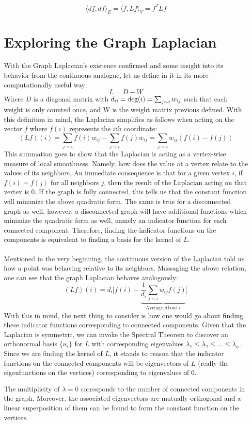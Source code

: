 \[
\langle df, df \rangle_E = \langle f, Lf \rangle_V = f^TLf
\]

\section{Exploring the Graph Laplacian}
With the Graph Laplacian's existence confirmed and some insight into
its behavior from the continuous analogue, let us define in it in its
more computationally useful way: 
\[
L = D - W 
\]
Where \(D\) is a diagonal matrix with \(d_{ii} = \textnormal{deg}(i) =
\sum_{j \sim i} w_{ij}\) such that each weight is only counted once,
and W is the weight matrix previous defined. With this definition in
mind, the Laplacian simplifies as follows when acting on the vector
\(f\) where \(f(i)\) represents the \(i\)th coordinate: 
\[
(Lf)(i) = \sum_{j \sim i} f(i) w_{ij} - \sum_{j \sim i} f(j) w_{ij} =
\sum_{j \sim i} w_{ij}(f(i) - f(j)) 
\]
This summation goes to show that the Laplacian is acting as a
vertex-wise measure of local smoothness. Namely, how does the value at
a vertex relate to the values of its neighbors. An immediate
consequence is that for a given vertex \(i\), if \(f(i) = f(j)\) for
all neighbors \(j\), then the result of the Laplacian acting on that
vertex is 0. If the graph is fully connected, this tells us that the
constant function will minimize the above quadratic form. The same is
true for a disconnected graph as well, however, a disconnected graph
will have additional functions which minimize the quadratic form as
well, namely an indicator function for each connected
component. Therefore, finding the indicator functions on the
components is equivalent to finding a basis for the kernel of \(L\). 
\\\\
Mentioned in the very beginning, the continuous version of the
Laplacian told us how a point was behaving relative to its
neighbors. Massaging the above relation, one can see that the graph
Laplacian behaves analogously: 
\[
(Lf)(i) = d_{i} \bigg[ f(i) - \underbrace{\frac{1}{d_i} \sum_{j \sim
      i} w_{ij}f(j)}_\text{Average About \(i\)} \bigg] 
\]
With this in mind, the next thing to consider is how one would go
about finding these indicator functions corresponding to connected
components. Given that the Laplacian is symmetric, we can invoke the
Spectral Theorem to discover an orthonormal basis \(\{u_i\}\) for
\(L\) with corresponding eigenvalues \(\lambda_1 \leq \lambda_2 \leq
...\leq \lambda_n\). Since we are finding the kernel of \(L\), it
stands to reason that the indicator functions on the connected
components will be eigenvectors of \(L\) (really the eigenfunctions on
the vertices) corresponding to eigenvalues of 0. 
\begin{claim}
The multiplicity of \(\lambda = 0\) corresponds to the number of
connected components in the graph. Moreover, the associated
eigenvectors are mutually orthogonal and a linear superposition of
them can be found to form the constant function on the vertices. 
\end{claim}

